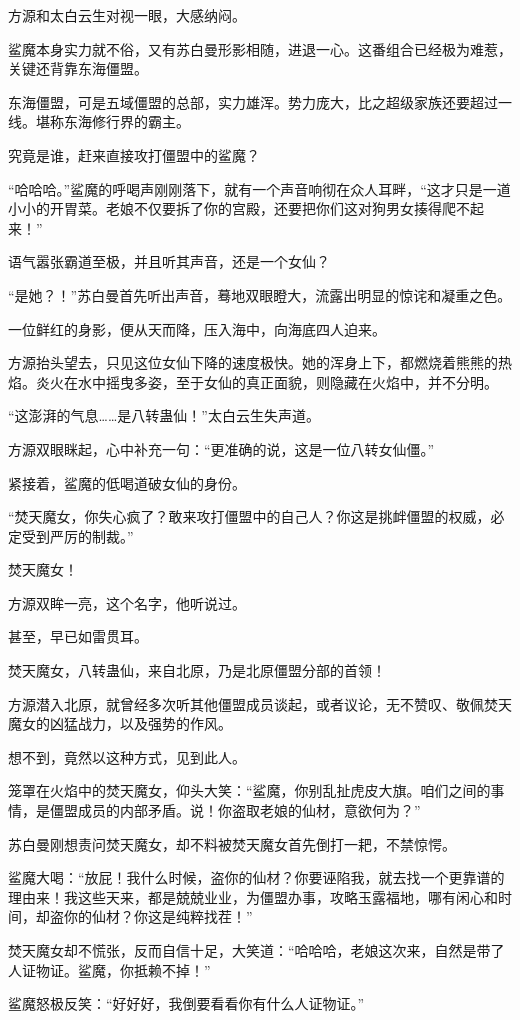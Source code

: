 \begin{this_body}
方源和太白云生对视一眼，大感纳闷。

鲨魔本身实力就不俗，又有苏白曼形影相随，进退一心。这番组合已经极为难惹，关键还背靠东海僵盟。

东海僵盟，可是五域僵盟的总部，实力雄浑。势力庞大，比之超级家族还要超过一线。堪称东海修行界的霸主。

究竟是谁，赶来直接攻打僵盟中的鲨魔？

“哈哈哈。”鲨魔的呼喝声刚刚落下，就有一个声音响彻在众人耳畔，“这才只是一道小小的开胃菜。老娘不仅要拆了你的宫殿，还要把你们这对狗男女揍得爬不起来！”

语气嚣张霸道至极，并且听其声音，还是一个女仙？

“是她？！”苏白曼首先听出声音，蓦地双眼瞪大，流露出明显的惊诧和凝重之色。

一位鲜红的身影，便从天而降，压入海中，向海底四人迫来。

方源抬头望去，只见这位女仙下降的速度极快。她的浑身上下，都燃烧着熊熊的热焰。炎火在水中摇曳多姿，至于女仙的真正面貌，则隐藏在火焰中，并不分明。

“这澎湃的气息……是八转蛊仙！”太白云生失声道。

方源双眼眯起，心中补充一句：“更准确的说，这是一位八转女仙僵。”

紧接着，鲨魔的低喝道破女仙的身份。

“焚天魔女，你失心疯了？敢来攻打僵盟中的自己人？你这是挑衅僵盟的权威，必定受到严厉的制裁。”

焚天魔女！

方源双眸一亮，这个名字，他听说过。

甚至，早已如雷贯耳。

焚天魔女，八转蛊仙，来自北原，乃是北原僵盟分部的首领！

方源潜入北原，就曾经多次听其他僵盟成员谈起，或者议论，无不赞叹、敬佩焚天魔女的凶猛战力，以及强势的作风。

想不到，竟然以这种方式，见到此人。

笼罩在火焰中的焚天魔女，仰头大笑：“鲨魔，你别乱扯虎皮大旗。咱们之间的事情，是僵盟成员的内部矛盾。说！你盗取老娘的仙材，意欲何为？”

苏白曼刚想责问焚天魔女，却不料被焚天魔女首先倒打一耙，不禁惊愕。

鲨魔大喝：“放屁！我什么时候，盗你的仙材？你要诬陷我，就去找一个更靠谱的理由来！我这些天来，都是兢兢业业，为僵盟办事，攻略玉露福地，哪有闲心和时间，却盗你的仙材？你这是纯粹找茬！”

焚天魔女却不慌张，反而自信十足，大笑道：“哈哈哈，老娘这次来，自然是带了人证物证。鲨魔，你抵赖不掉！”

鲨魔怒极反笑：“好好好，我倒要看看你有什么人证物证。”

\end{this_body}

